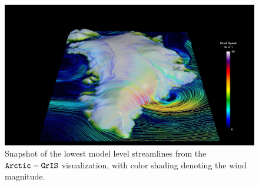 \documentclass[draft]{agujournal2019}
\begin{document}
\begin{figure}[t]
\begin{center}
         \includegraphics[width=130mm]{figs/Vis1472.jpg}
\end{center}
\caption{Snapshot of the lowest model level streamlines from the $\tt Arctic-GrIS$ visualization, with color shading denoting the wind magnitude.}
\label{fig:viz}
\end{figure}

%
%
%
%


\end{document}

